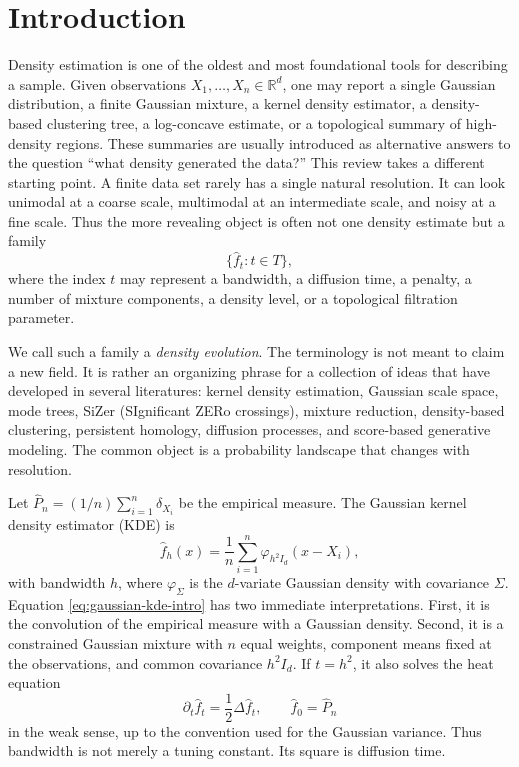 \documentclass[preprint]{imsart}
\theoremstyle{plain}
\theoremstyle{definition}
\newcommand{\R}{\mathbb{R}}
\newcommand{\Emp}{\widehat P_n}
\newcommand{\fhat}{\widehat f}
\begin{document}
\section{Introduction}


Density estimation is one of the oldest and most foundational tools for describing a sample. Given observations $X_1,\ldots,X_n\in\R^d$,
one may report a single Gaussian distribution, a finite Gaussian mixture, a kernel density estimator, a density-based clustering tree, a log-concave estimate, or a topological summary of high-density regions. These summaries are usually introduced as alternative answers to the question ``what density generated the data?'' This review takes a different starting point. A finite data set rarely has a single natural resolution. It can look unimodal at a coarse scale, multimodal at an intermediate scale, and noisy at a fine scale. Thus the more revealing object is often not one density estimate but a family
\begin{equation*}
  \{\fhat_t:t\in T\},
\end{equation*}
where the index $t$ may represent a bandwidth, a diffusion time, a penalty, a number of mixture components, a density level, or a topological filtration parameter.

We call such a family a \emph{density evolution}. The terminology is not meant to claim a new field. It is rather an organizing phrase for a collection of ideas that have developed in several literatures: kernel density estimation, Gaussian scale space, mode trees, SiZer (SIgnificant ZERo crossings), mixture reduction, density-based clustering, persistent homology, diffusion processes, and score-based generative modeling. The common object is a probability landscape that changes with resolution.

Let $\Emp = (1/n)\sum_{i=1}^n \delta_{X_i}$ be the empirical measure. The Gaussian kernel density estimator (KDE) is
\begin{equation}
  \fhat_h(x) = \frac{1}{n}\sum_{i=1}^n \varphi_{h^2 I_d}(x-X_i),
  \label{eq:gaussian-kde-intro}
\end{equation}
with bandwidth $h$, where $\varphi_{\Sigma}$ is the $d$-variate Gaussian density with covariance $\Sigma$. Equation \eqref{eq:gaussian-kde-intro} has two immediate interpretations. First, it is the convolution of the empirical measure with a Gaussian density. Second, it is a constrained Gaussian mixture with $n$ equal weights, component means fixed at the observations, and common covariance $h^2I_d$. If $t=h^2$, it also solves the heat equation
\begin{equation*}
  \partial_t \fhat_t=\frac12\Delta \fhat_t,
  \qquad
  \fhat_0=\Emp
\end{equation*}
in the weak sense, up to the convention used for the Gaussian variance. Thus bandwidth is not merely a tuning constant. Its square is diffusion time.
\end{document}
